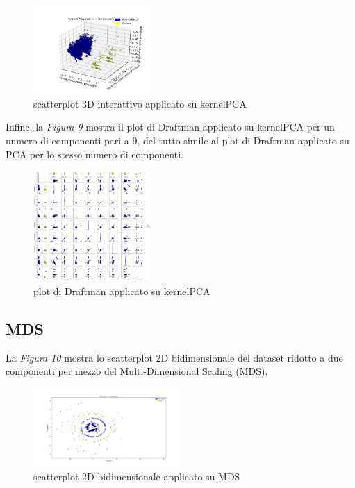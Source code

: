 \documentclass[11pt,a4paper,twocolumn]{article}
\begin{document}
	\begin{figure}[H]
		\centering
		\includegraphics[width=0.4\textwidth]{img/kernelPCA_i3D.png}
		\caption{scatterplot 3D interattivo applicato su kernelPCA}
	\end{figure}

	Infine, la \emph{Figura 9} mostra il plot di Draftman applicato su kernelPCA per un numero di componenti pari a 9, del tutto simile al plot di Draftman applicato su PCA per lo stesso numero di componenti.

	\begin{figure}[h]
		\centering
		\includegraphics[width=0.4\textwidth]{img/kernelPCA_SPLOM.png}
		\caption{plot di Draftman applicato su kernelPCA}
	\end{figure}

	\subsection{MDS}

	La \emph{Figura 10} mostra lo scatterplot 2D bidimensionale del dataset ridotto a due componenti per mezzo del Multi-Dimensional Scaling (MDS).

	\begin{figure}[H]
		\centering
		\includegraphics[width=0.5\textwidth]{img/MDS_2Dnc2.png}
		\caption{scatterplot 2D bidimensionale applicato su MDS}
	\end{figure}
\end{document}
